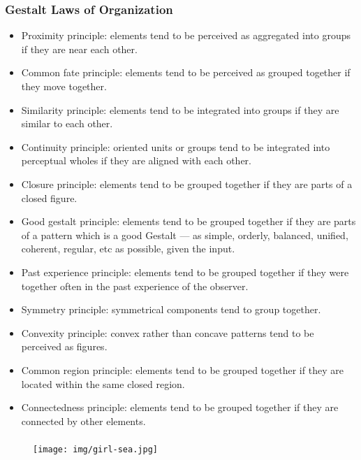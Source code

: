 \documentclass[UTF8,11pt,colorlinks,compress,openany]{beamer}%
\begin{document}
\begin{frame}\frametitle{Gestalt Laws of Organization}
\vspace*{-1ex}
\begin{itemize}\footnotesize
\item Proximity principle: elements tend to be perceived as aggregated into groups if they are near each other.
\item Common fate principle: elements tend to be perceived as grouped together if they move together.
\item Similarity principle: elements tend to be integrated into groups if they are similar to each other.
\item Continuity principle: oriented units or groups tend to be integrated into perceptual wholes if they are aligned with each other.
\item Closure principle: elements tend to be grouped together if they are parts of a closed figure.
\item Good gestalt principle: elements tend to be grouped together if they are parts of a pattern which is a good Gestalt --- as simple, orderly, balanced, unified, coherent, regular, etc as possible, given the input.
\item Past experience principle: elements tend to be grouped together if they were together often in the past experience of the observer.
\item Symmetry principle: symmetrical components tend to group together.
\item Convexity principle: convex rather than concave patterns tend to be perceived as figures.
\item Common region principle: elements tend to be grouped together if they are located within the same closed region.
\item Connectedness principle: elements tend to be grouped together if they are connected by other elements.
\end{itemize}	
\end{frame}

\begin{frame}\frametitle{}
\vspace*{-26ex}
\begin{figure}[H]
\texttt{[image: img/girl-sea.jpg]}
\end{figure}
\end{frame}
\end{document}

